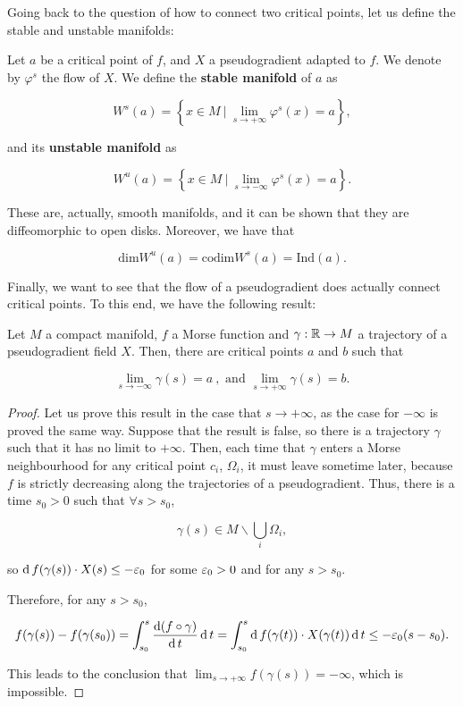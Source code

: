 Going back to the question of how to connect two critical points, let us define the stable and unstable manifolds:

\begin{deff}
Let $a$ be a critical point of $f$, and $X$ a pseudogradient adapted to $f$. We denote by $\varphi^s$ the flow of $X$. We define the {\bf stable manifold} of $a$ as

$$W^s(a) = \left\{ x \in M \ | \ \lim_{s \rightarrow + \infty} \varphi^s(x) = a \right\}, $$

and its {\bf unstable manifold} as

$$W^u(a) = \left\{ x \in M \ | \ \lim_{s \rightarrow - \infty} \varphi^s(x) = a \right\} .$$
\end{deff}

These are, actually, smooth manifolds, and it can be shown that they are diffeomorphic to open disks. Moreover, we have that

$$\text{dim} W^u(a) = \text{codim} W^s(a) = \text{Ind}(a) .$$

Finally, we want to see that the flow of a pseudogradient does actually connect critical points. To this end, we have the following result:

\begin{prop}
Let $M$ a compact manifold, $f$ a Morse function and $\gamma : \mathbb{R} \rightarrow M$ a trajectory of a pseudogradient field $X$. Then, there are critical points $a$ and $b$ such that

\begin{displaymath}
\lim_{s \rightarrow - \infty} \gamma(s) = a \ , \text{ and } \lim_{s \rightarrow + \infty} \gamma(s) = b .
\end{displaymath}
\end{prop}

\begin{proof}
Let us prove this result in the case that $s \rightarrow + \infty$, as the case for $- \infty$ is proved the same way. Suppose that the result is false, so there is a trajectory $\gamma$ such that it has no limit to $+ \infty$. Then, each time that $\gamma$ enters a Morse neighbourhood for any critical point $c_i$, $\Omega_i$, it must leave sometime later, because $f$ is strictly decreasing along the trajectories of a pseudogradient. Thus, there is a time $s_0 > 0$ such that $\forall s > s_0$,

$$\gamma(s) \in M \backslash \bigcup_i \Omega_i ,$$

so $\operatorname d f(\gamma(s)) \cdot X(s) \leq - \varepsilon_0$ for some $\varepsilon_0 > 0$ and for any $s > s_0$.

Therefore, for any $s > s_0$,

\begin{displaymath}
f(\gamma(s))-f(\gamma(s_0)) = \int_{s_0}^s \frac{\operatorname d (f \circ \gamma)}{\operatorname d t} \operatorname d t = \int_{s_0}^s \operatorname d f(\gamma(t)) \cdot X(\gamma(t)) \operatorname d t \leq - \varepsilon_0 (s-s_0) .
\end{displaymath}

This leads to the conclusion that $\displaystyle\lim_{s \rightarrow +\infty} f(\gamma(s)) = - \infty$, which is impossible.
\end{proof}

